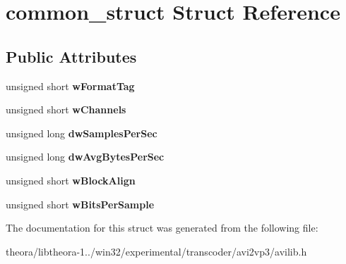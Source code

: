 \hypertarget{structcommon__struct}{\section{common\+\_\+struct Struct Reference}
\label{structcommon__struct}
}
\subsection*{Public Attributes}
\begin{DoxyCompactItemize}
\item 
\hypertarget{structcommon__struct_aa93065d11ffea63745fa54ce44f11772}{unsigned short {\bfseries w\+Format\+Tag}}\label{structcommon__struct_aa93065d11ffea63745fa54ce44f11772}

\item 
\hypertarget{structcommon__struct_a7d73da7a71420badaa1e65ed42f42df5}{unsigned short {\bfseries w\+Channels}}\label{structcommon__struct_a7d73da7a71420badaa1e65ed42f42df5}

\item 
\hypertarget{structcommon__struct_a6b30d9039ba850430a970ef6a00e5ec4}{unsigned long {\bfseries dw\+Samples\+Per\+Sec}}\label{structcommon__struct_a6b30d9039ba850430a970ef6a00e5ec4}

\item 
\hypertarget{structcommon__struct_a10444f8f7fe247a5d8adaee9ca69e4b8}{unsigned long {\bfseries dw\+Avg\+Bytes\+Per\+Sec}}\label{structcommon__struct_a10444f8f7fe247a5d8adaee9ca69e4b8}

\item 
\hypertarget{structcommon__struct_a55f7a5e978bd441174ea82d481de3754}{unsigned short {\bfseries w\+Block\+Align}}\label{structcommon__struct_a55f7a5e978bd441174ea82d481de3754}

\item 
\hypertarget{structcommon__struct_aa2bbc21b6736ecec3d0bf5caa2efd474}{unsigned short {\bfseries w\+Bits\+Per\+Sample}}\label{structcommon__struct_aa2bbc21b6736ecec3d0bf5caa2efd474}

\end{DoxyCompactItemize}


The documentation for this struct was generated from the following file\+:\begin{DoxyCompactItemize}
\item 
theora/libtheora-\/1../win32/experimental/transcoder/avi2vp3/avilib.\+h\end{DoxyCompactItemize}
